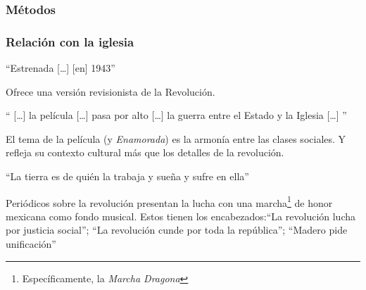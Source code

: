 \subsubsection{Métodos}
\subsubsection{Relación con la iglesia}
    \begin{compactitem}
    \item ``Estrenada [\ldots] [en] 1943''\autocite[17]{garcia_riera_historia_1992}
    \item Ofrece una versión revisionista de la Revolución.\autocite[369]{sanchez_vi._2010}
    \item `` [\ldots] la película [\ldots] pasa por alto [\ldots] la guerra entre el Estado y la Iglesia [\ldots] ''\autocite[370]{sanchez_vi._2010}
    \item El tema de la película (y \emph{Enamorada}) es la armonía entre las clases sociales. Y refleja su contexto cultural más que los detalles de la revolución.\autocite[365]{sanchez_vi._2010}
    \item ``La tierra es de quién la trabaja y sueña y sufre en ella''\autocite[11:14]{fernandez_flor_1943}
    \item  Periódicos sobre la revolución presentan la lucha con una marcha\footnote{Específicamente, la \emph{Marcha Dragona}} de honor mexicana como fondo musical. Estos tienen los encabezados:``La revolución lucha por justicia social''; ``La revolución cunde por toda la república''; ``Madero pide unificación''\autocite[42:38-43:20]{fernandez_flor_1943}

\end{compactitem}
